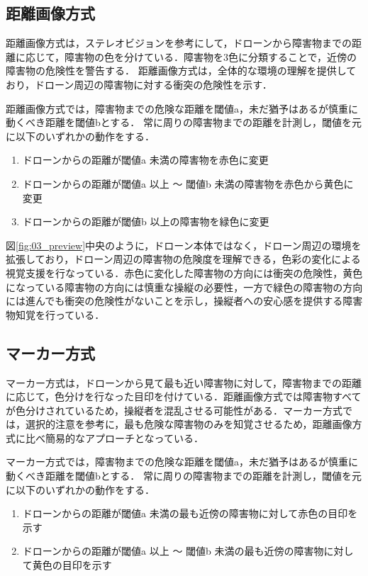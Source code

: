 \documentclass[submit]{ipsj}
\begin{document}
\subsection{距離画像方式}
距離画像方式は，ステレオビジョンを参考にして，ドローンから障害物までの距離に応じて，障害物の色を分けている．障害物を3色に分類することで，近傍の障害物の危険性を警告する．
距離画像方式は，全体的な環境の理解を提供しており，ドローン周辺の障害物に対する衝突の危険性を示す．
\par
距離画像方式では，障害物までの危険な距離を閾値a，未だ猶予はあるが慎重に動くべき距離を閾値bとする．
常に周りの障害物までの距離を計測し，閾値を元に以下のいずれかの動作をする．

\begin{enumerate}
	\item ドローンからの距離が閾値a 未満の障害物を赤色に変更
    
  \item ドローンからの距離が閾値a 以上 〜 閾値b 未満の障害物を赤色から黄色に変更
    
  \item ドローンからの距離が閾値b 以上の障害物を緑色に変更
\end{enumerate}

図\ref{fig:03_preview}中央のように，ドローン本体ではなく，ドローン周辺の環境を拡張しており，ドローン周辺の障害物の危険度を理解できる，色彩の変化による視覚支援を行なっている．赤色に変化した障害物の方向には衝突の危険性，黄色になっている障害物の方向には慎重な操縦の必要性，一方で緑色の障害物の方向には進んでも衝突の危険性がないことを示し，操縦者への安心感を提供する障害物知覚を行っている．



\subsection{マーカー方式}
マーカー方式は，ドローンから見て最も近い障害物に対して，障害物までの距離に応じて，色分けを行なった目印を付けている．距離画像方式では障害物すべてが色分けされているため，操縦者を混乱させる可能性がある．マーカー方式では，選択的注意を参考に，最も危険な障害物のみを知覚させるため，距離画像方式に比べ簡易的なアプローチとなっている．
\par
マーカー方式では，障害物までの危険な距離を閾値a，未だ猶予はあるが慎重に動くべき距離を閾値bとする．
常に周りの障害物までの距離を計測し，閾値を元に以下のいずれかの動作をする．

\begin{enumerate}
	\item ドローンからの距離が閾値a 未満の最も近傍の障害物に対して赤色の目印を示す
    
    \item ドローンからの距離が閾値a 以上 〜 閾値b 未満の最も近傍の障害物に対して黄色の目印を示す
\end{enumerate}
\end{document}
